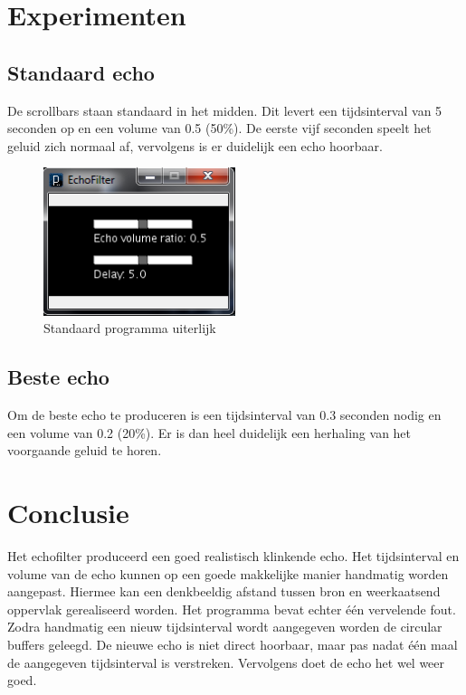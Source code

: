 \documentclass[a4paper]{article}
\begin{document}
\newpage

	\section{Experimenten}
	\subsection{Standaard echo}
		De scrollbars staan standaard in het midden. Dit levert een tijdsinterval van 5 seconden op en een volume van 0.5 (50\%). De eerste vijf seconden speelt het geluid zich normaal af, vervolgens is er duidelijk een echo hoorbaar.
	\begin{figure}[h]
		\begin{center}
			\includegraphics[width=0.5\textwidth]{echofilter.png}
			\caption{Standaard programma uiterlijk}
		\end{center}
	\end{figure}
	\subsection{Beste echo}
		Om de beste echo te produceren is een tijdsinterval van 0.3 seconden nodig en een volume van 0.2 (20\%). Er is dan heel duidelijk een herhaling van het voorgaande geluid te horen.

\newpage

	\section{Conclusie}
		Het echofilter produceerd een goed realistisch klinkende echo. Het tijdsinterval en volume van de echo kunnen op een goede makkelijke manier handmatig worden aangepast. Hiermee kan een denkbeeldig afstand tussen bron en weerkaatsend oppervlak gerealiseerd worden. Het programma bevat echter \'e\'en vervelende fout. Zodra handmatig een nieuw tijdsinterval wordt aangegeven worden de circular buffers geleegd. De nieuwe echo is niet direct hoorbaar, maar pas nadat \'e\'en maal de aangegeven tijdsinterval is verstreken. Vervolgens doet de echo het wel weer goed. 
		
\end{document}
